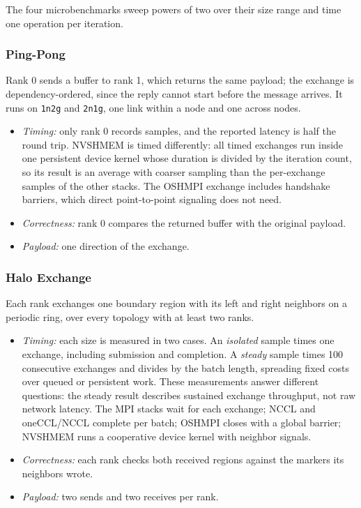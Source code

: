 The four microbenchmarks sweep powers of two over their size range and time one operation per iteration.

\subsubsection{Ping-Pong}

Rank 0 sends a buffer to rank 1, which returns the same payload; the exchange is dependency-ordered, since the reply cannot start before the message arrives. It runs on \texttt{1n2g} and \texttt{2n1g}, one link within a node and one across nodes.
\begin{itemize}
    \item \emph{Timing:} only rank 0 records samples, and the reported latency is half the round trip. NVSHMEM is timed differently: all timed exchanges run inside one persistent device kernel whose duration is divided by the iteration count, so its result is an average with coarser sampling than the per-exchange samples of the other stacks. The OSHMPI exchange includes handshake barriers, which direct point-to-point signaling does not need.
    \item \emph{Correctness:} rank 0 compares the returned buffer with the original payload.
    \item \emph{Payload:} one direction of the exchange.
\end{itemize}

\subsubsection{Halo Exchange}

Each rank exchanges one boundary region with its left and right neighbors on a periodic ring, over every topology with at least two ranks.
\begin{itemize}
    \item \emph{Timing:} each size is measured in two cases. An \emph{isolated} sample times one exchange, including submission and completion. A \emph{steady} sample times 100 consecutive exchanges and divides by the batch length, spreading fixed costs over queued or persistent work. These measurements answer different questions: the steady result describes sustained exchange throughput, not raw network latency. The MPI stacks wait for each exchange; NCCL and oneCCL/NCCL complete per batch; OSHMPI closes with a global barrier; NVSHMEM runs a cooperative device kernel with neighbor signals.
    \item \emph{Correctness:} each rank checks both received regions against the markers its neighbors wrote.
    \item \emph{Payload:} two sends and two receives per rank.
\end{itemize}

